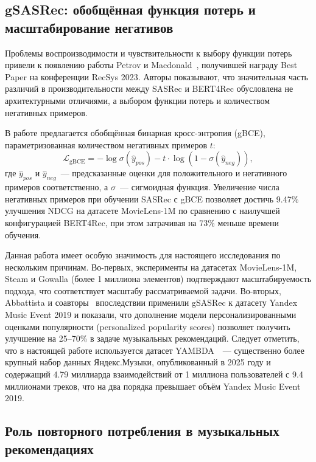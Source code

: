 \subsection{gSASRec: обобщённая функция потерь и масштабирование негативов}

Проблемы воспроизводимости и чувствительности к выбору функции потерь привели к появлению работы Petrov и Macdonald~\cite{gsasrec2023}, получившей награду Best Paper на конференции RecSys 2023. Авторы показывают, что значительная часть различий в производительности между SASRec и BERT4Rec обусловлена не архитектурными отличиями, а выбором функции потерь и количеством негативных примеров.

В работе предлагается обобщённая бинарная кросс-энтропия (gBCE), параметризованная количеством негативных примеров $t$:
\begin{equation}
    \mathcal{L}_{\mathrm{gBCE}} = -\log \sigma(\hat{y}_{pos}) - t \cdot \log(1 - \sigma(\hat{y}_{neg})),
\end{equation}
где $\hat{y}_{pos}$ и $\hat{y}_{neg}$~--- предсказанные оценки для положительного и негативного примеров соответственно, а $\sigma$~--- сигмоидная функция. Увеличение числа негативных примеров при обучении SASRec с gBCE позволяет достичь 9.47\% улучшения NDCG на датасете MovieLens-1M по сравнению с наилучшей конфигурацией BERT4Rec, при этом затрачивая на 73\% меньше времени обучения.

Данная работа имеет особую значимость для настоящего исследования по нескольким причинам. Во-первых, эксперименты на датасетах MovieLens-1M, Steam и Gowalla (более 1 миллиона элементов) подтверждают масштабируемость подхода, что соответствует масштабу рассматриваемой задачи. Во-вторых, Abbattista и соавторы~\cite{abbattista2024sequential} впоследствии применили gSASRec к датасету Yandex Music Event 2019 и показали, что дополнение модели персонализированными оценками популярности (personalized popularity scores) позволяет получить улучшение на 25--70\% в задаче музыкальных рекомендаций. Следует отметить, что в настоящей работе используется датасет YAMBDA~\cite{yambda2025}~--- существенно более крупный набор данных Яндекс.Музыки, опубликованный в 2025 году и содержащий 4.79 миллиарда взаимодействий от 1 миллиона пользователей с 9.4 миллионами треков, что на два порядка превышает объём Yandex Music Event 2019.

\subsection{Роль повторного потребления в музыкальных рекомендациях}

